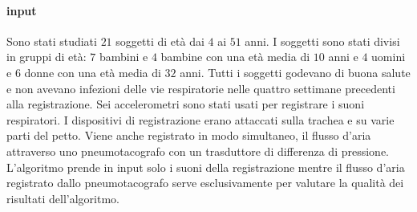 \begin{frame}
    \paragraph{input}
      Sono stati studiati $21$ soggetti di et\`a dai $4$ ai $51$ anni. I soggetti sono stati divisi in gruppi di et\`a: $7$ bambini e $4$ bambine con una et\`a media di $10$ anni e $4$ uomini e $6$ donne con una et\`a media di $32$ anni. 
      Tutti i soggetti godevano di buona salute e non avevano infezioni delle vie respiratorie nelle quattro settimane precedenti alla registrazione. 
      Sei accelerometri sono stati usati per registrare i suoni respiratori. 
      I dispositivi di registrazione erano attaccati sulla trachea e su varie parti del petto. 
      Viene anche registrato in modo simultaneo, il flusso d'aria attraverso uno pneumotacografo con un trasduttore di differenza di pressione. 
      L'algoritmo prende in input solo i suoni della registrazione mentre il flusso d'aria registrato dallo pneumotacografo serve esclusivamente per valutare la qualit\`a dei risultati dell'algoritmo. 

\end{frame}
